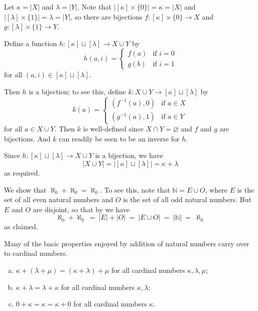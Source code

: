 \begin{cproof}
Let $\kappa = |X|$ and $\lambda = |Y|$. Note that $|[\kappa] \times \{ 0 \}| = \kappa = |X|$ and $|[\lambda] \times \{ 1 \}| = \lambda = |Y|$, so there are bijections $f : [\kappa] \times \{ 0 \} \to X$ and $g : [\lambda] \times \{ 1 \} \to Y$.

Define a function $h : [\kappa] \sqcup [\lambda] \to X \cup Y$ by
\[ h(a,i) = \begin{cases} f(a) & \text{if } i=0 \\ g(b) & \text{if } i=1 \end{cases} \]
for all $(a,i) \in [\kappa] \sqcup [\lambda]$.

Then $h$ is a bijection; to see this, define $k : X \cup Y \to [\kappa] \sqcup [\lambda]$ by
\[ k(a) = \begin{cases} (f^{-1}(a), 0) & \text{if } a \in X \\ (g^{-1}(a), 1) & \text{if } a \in Y \end{cases} \]
for all $a \in X \cup Y$. Then $k$ is well-defined since $X \cap Y = \varnothing$ and $f$ and $g$ are bijections. And $k$ can readily be seen to be an inverse for $h$.

Since $h : [\kappa] \sqcup [\lambda] \to X \cup Y$ is a bijection, we have
\[ |X \cup Y| = |[\kappa] \sqcup [\lambda]| = \kappa + \lambda \]
as required.
\end{cproof}

\begin{example}
\label{exAlephNaughtPlusAlephNaughtEqualsAlephNaught}
We show that $\aleph_0 + \aleph_0 = \aleph_0$. To see this, note that $\mathbb{N} = E \cup O$, where $E$ is the set of all even natural numbers and $O$ is the set of all odd natural numbers. But $E$ and $O$ are disjoint, so that by  we have
\[ \aleph_0 + \aleph_0 ~=~ |E| + |O| ~=~ |E \cup O| ~=~ |\mathbb{N}| ~=~ \aleph_0 \]
as claimed.
\end{example}

Many of the basic properties enjoyed by addition of natural numbers carry over to cardinal numbers.

\begin{theorem}
\label{thmPropertiesOfCardinalAddition}
\fixlistskip
\begin{enumerate}[(a)]
\item $\kappa + (\lambda + \mu) = (\kappa + \lambda) + \mu$ for all cardinal numbers $\kappa, \lambda, \mu$;
\item $\kappa + \lambda = \lambda + \kappa$ for all cardinal numbers $\kappa, \lambda$;
\item $0 + \kappa = \kappa = \kappa + 0$ for all cardinal numbers $\kappa$.
\end{enumerate}
\end{theorem}

